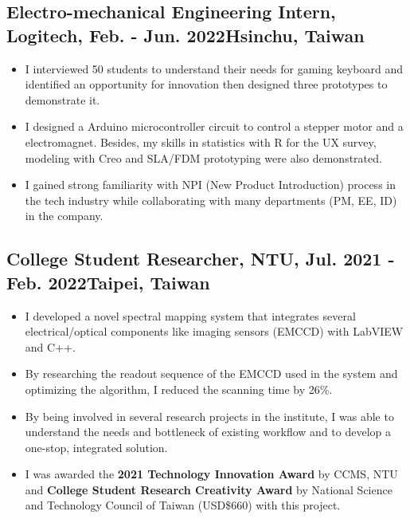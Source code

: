 \documentclass[12pt]{article}
\begin{document}
        \subsection*{Electro-mechanical Engineering Intern, Logitech, Feb. - Jun. 2022\hfill Hsinchu, Taiwan}
        { \small
        \begin{itemize}
            \item I interviewed 50 students to understand their needs for gaming keyboard and identified an opportunity for innovation then designed three prototypes to demonstrate it.
            \item I designed a Arduino microcontroller circuit to control a stepper motor and a electromagnet. Besides, my skills in statistics with R for the UX survey, modeling with Creo and SLA/FDM prototyping were also demonstrated.
            \item I gained strong familiarity with NPI (New Product Introduction) process in the tech industry while collaborating with many departments (PM, EE, ID) in the company.
        \end{itemize}
        }
        \subsection*{College Student Researcher, NTU, Jul. 2021 - Feb. 2022\hfill Taipei, Taiwan}
        { \small
        \begin{itemize}
            \item I developed a novel spectral mapping system that integrates several electrical/optical components like imaging sensors (EMCCD) with LabVIEW and C++. %
            \item By researching the readout sequence of the EMCCD used in the system and optimizing the algorithm, I reduced the scanning time by 26\%.
            \item By being involved in several research projects in the institute, I was able to understand the needs and bottleneck of existing workflow and to develop a one-stop, integrated solution.
            \item I was awarded the \textbf{2021 Technology Innovation Award} by CCMS, NTU and \textbf{College Student Research Creativity Award} by National Science and Technology Council of Taiwan (USD\$660) with this project.
        \end{itemize}}
\end{document}
